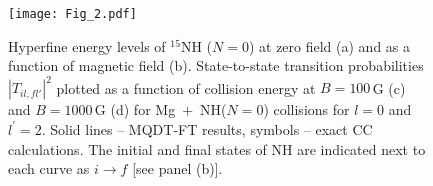 \documentclass[reprint,amssymb,noeprint,twocolumn,longbibliography]{revtex4-2}
\begin{document}





\begin{figure}[t]
\begin{center}
\texttt{[image: Fig\_2.pdf]}
\end{center}
\caption{Hyperfine energy levels of $^{15}$NH ($N=0$) at zero field (a) and as a function of magnetic field (b). 
State-to-state transition probabilities $|T_{il, fl'}|^2$  plotted as a function of collision energy at $B=100$\,G (c) and $B=1000$\,G (d) for  Mg~+~NH($N=0$) collisions for $l=0 $ and $l^\prime=2$. 
Solid lines -- MQDT-FT results, symbols -- exact CC calculations. 
The initial and final states of NH are indicated next to each curve as $i \to f$ [see panel (b)].
}
\label{Fig_2}
\end{figure}
\end{document}
